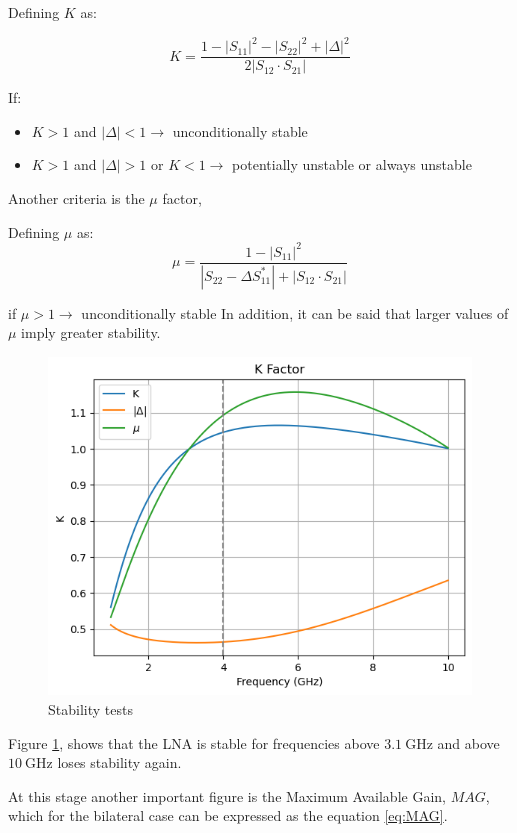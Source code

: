 Defining $K$ as:

\begin{equation}
    K = \frac{1-|S_{11}|^2-|S_{22}|^2+|\Delta|^2}{2|S_{12}\cdot S_{21}|}
\end{equation}

If:
\begin{itemize}
    \item $K>1$ and $|\Delta|<1\rightarrow$ unconditionally stable
    \item $K>1$ and $|\Delta| > 1$ or  $K<1 \rightarrow$ potentially unstable or always unstable
\end{itemize}

Another criteria is the $\mu$ factor,

Defining $\mu$ as:
$$\mu = \frac{1-|S_{11}|^2}{|S_{22}-\Delta S_{11}^*| + |S_{12}\cdot S_{21}|}$$

if $\mu > 1\rightarrow$ unconditionally stable
In addition, it can be said that larger values of $\mu$ imply greater stability.

\begin{figure}[H]
    \centering
    \includegraphics*[scale = 0.5]{Images/KFactor.png}
    \caption{Stability tests}
    \label{fig:StabilityTest}
\end{figure}

Figure \ref{fig:StabilityTest}, shows that the LNA is stable for frequencies above $\SI{3.1}{\giga\hertz}$ and above $\SI{10}{\giga\hertz}$ loses stability again.

At this stage another important figure is the Maximum Available Gain, $MAG$, which for the bilateral case can be expressed as the equation \ref{eq:MAG}.

